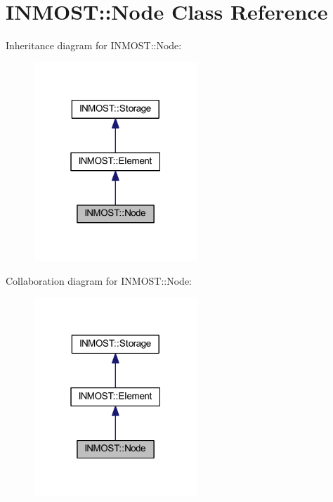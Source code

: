 \hypertarget{classINMOST_1_1Node}{\section{I\-N\-M\-O\-S\-T\-:\-:Node Class Reference}
\label{classINMOST_1_1Node}
}


Inheritance diagram for I\-N\-M\-O\-S\-T\-:\-:Node\-:
\nopagebreak
\begin{figure}[H]
\begin{center}
\leavevmode
\includegraphics[width=175pt]{classINMOST_1_1Node__inherit__graph}
\end{center}
\end{figure}


Collaboration diagram for I\-N\-M\-O\-S\-T\-:\-:Node\-:
\nopagebreak
\begin{figure}[H]
\begin{center}
\leavevmode
\includegraphics[width=175pt]{classINMOST_1_1Node__coll__graph}
\end{center}
\end{figure}
